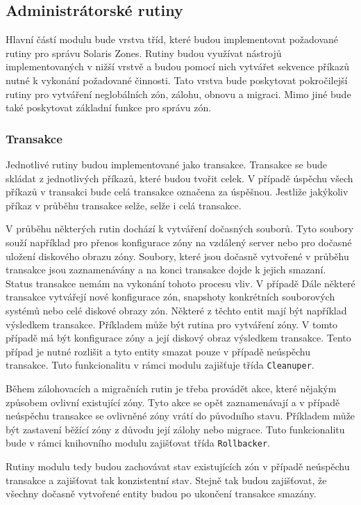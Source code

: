 \subsection{Administrátorské rutiny}
\label{chapter:implementation:szones:routines}
Hlavní částí modulu bude vrstva tříd, které budou implementovat požadované rutiny pro správu Solaris Zones. Rutiny budou využívat
nástrojů implementovaných v nižší vrstvě a budou pomocí nich vytvářet sekvence příkazů nutné k vykonání požadované činnosti.
Tato vrstva bude poskytovat pokročilejší rutiny pro vytváření neglobálních zón, zálohu, obnovu a migraci. Mimo jiné bude také
poskytovat základní funkce pro správu zón. 
\subsubsection{Transakce}
\label{chapter:implementation:szones:routines:transaction}
Jednotlivé rutiny budou implementované jako transakce. Transakce se bude skládat z jednotlivých příkazů, které budou tvořit
celek. V případě úspěchu všech příkazů v transakci bude celá transakce označena za úspěšnou. Jestliže jakýkoliv příkaz v průběhu
transakce selže, selže i celá transakce.

V průběhu některých rutin dochází k vytváření dočasných souborů. Tyto soubory souží například pro přenos konfigurace zóny
na vzdálený server nebo pro dočasné uložení diskového obrazu zóny. Soubory, které jsou dočasně vytvořené v průběhu transakce jsou
zaznamenávány a na konci transakce dojde k jejich smazaní. Status transakce nemám na vykonání tohoto procesu vliv. V případě
Dále některé transakce vytvářejí nové konfigurace zón, snapshoty konkrétních souborových systémů nebo celé diskové obrazy zón. 
Některé z těchto entit mají být například výsledkem transakce. Příkladem může být rutina pro vytváření zóny. V tomto případě 
má být konfigurace zóny a její diskový obraz výsledkem transakce. Tento případ je nutné rozlišit a tyto entity smazat pouze 
v případě neúspěchu transakce. Tuto funkcionalitu v rámci modulu zajišťuje třída \verb|Cleanuper|.

Během zálohovacích a migračních rutin je třeba provádět akce, které nějakým způsobem ovlivní existující zóny. Tyto akce se opět
zaznamenávají a v případě neúspěchu transakce se ovlivněné zóny vrátí do původního stavu. Příkladem může být zastavení běžící
zóny z důvodu její zálohy nebo migrace. Tuto funkcionalitu bude v rámci knihovního modulu zajišťovat třída \verb|Rollbacker|.

Rutiny modulu tedy budou zachovávat stav existujících zón v případě neúspěchu transakce a zajišťovat tak konzistentní stav. Stejně
tak budou zajišťovat, že všechny dočasně vytvořené entity budou po ukončení transakce smazány.
